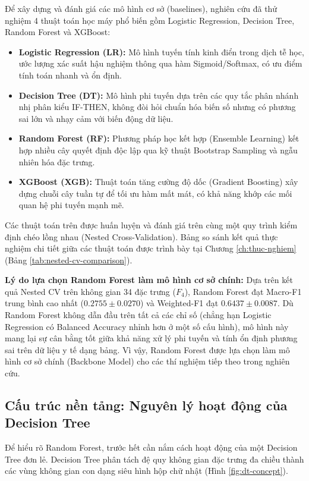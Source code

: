 Để xây dựng và đánh giá các mô hình cơ sở (baselines), nghiên cứu đã thử nghiệm 4 thuật toán học máy phổ biến gồm Logistic Regression, Decision Tree, Random Forest và XGBoost:
\begin{itemize}
    \item \textbf{Logistic Regression (LR):} Mô hình tuyến tính kinh điển trong dịch tễ học, ước lượng xác suất hậu nghiệm thông qua hàm Sigmoid/Softmax, có ưu điểm tính toán nhanh và ổn định.
    \item \textbf{Decision Tree (DT):} Mô hình phi tuyến dựa trên các quy tắc phân nhánh nhị phân kiểu IF-THEN, không đòi hỏi chuẩn hóa biến số nhưng có phương sai lớn và nhạy cảm với biến động dữ liệu.
    \item \textbf{Random Forest (RF):} Phương pháp học kết hợp (Ensemble Learning) kết hợp nhiều cây quyết định độc lập qua kỹ thuật Bootstrap Sampling và ngẫu nhiên hóa đặc trưng.
    \item \textbf{XGBoost (XGB):} Thuật toán tăng cường độ dốc (Gradient Boosting) xây dựng chuỗi cây tuần tự để tối ưu hàm mất mát, có khả năng khớp các mối quan hệ phi tuyến mạnh mẽ.
\end{itemize}

Các thuật toán trên được huấn luyện và đánh giá trên cùng một quy trình kiểm định chéo lồng nhau (Nested Cross-Validation). Bảng so sánh kết quả thực nghiệm chi tiết giữa các thuật toán được trình bày tại Chương \ref{ch:thuc-nghiem} (Bảng \ref{tab:nested-cv-comparison}).

\textbf{Lý do lựa chọn Random Forest làm mô hình cơ sở chính:} Dựa trên kết quả Nested CV trên không gian 34 đặc trưng ($F_4$), Random Forest đạt Macro-F1 trung bình cao nhất ($0.2755 \pm 0.0270$) và Weighted-F1 đạt $0.6437 \pm 0.0087$. Dù Random Forest không dẫn đầu trên tất cả các chỉ số (chẳng hạn Logistic Regression có Balanced Accuracy nhỉnh hơn ở một số cấu hình), mô hình này mang lại sự cân bằng tốt giữa khả năng xử lý phi tuyến và tính ổn định phương sai trên dữ liệu y tế dạng bảng. Vì vậy, Random Forest được lựa chọn làm mô hình cơ sở chính (Backbone Model) cho các thí nghiệm tiếp theo trong nghiên cứu.

\subsection{Cấu trúc nền tảng: Nguyên lý hoạt động của Decision Tree}
\label{subsec:decision-tree-theory}

Để hiểu rõ Random Forest, trước hết cần nắm cách hoạt động của một Decision Tree đơn lẻ. Decision Tree phân tách đệ quy không gian đặc trưng đa chiều thành các vùng không gian con dạng siêu hình hộp chữ nhật (Hình \ref{fig:dt-concept}).

